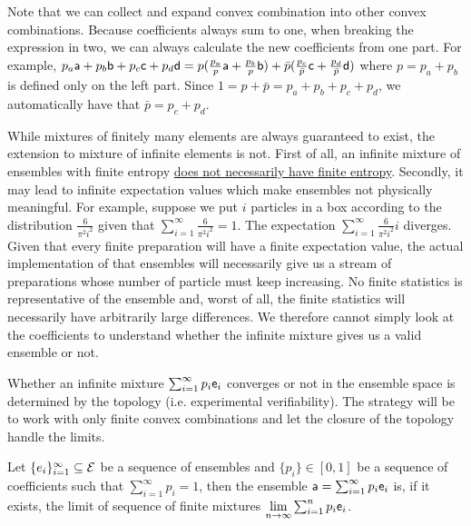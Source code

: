 \begin{remark}
	Note that we can collect and expand convex combination into other convex combinations. Because coefficients always sum to one, when breaking the expression in two, we can always calculate the new coefficients from one part. For example, $p_a \ens[a] + p_b \ens[b] + p_c \ens[c] + p_d \ens[d] = p(\frac{p_a}{p} \ens[a] + \frac{p_b}{p} \ens[b]) + \bar{p}(\frac{p_c}{\bar{p}} \ens[c] + \frac{p_d}{\bar{p}} \ens[d])$ where $p = p_a + p_b$ is defined only on the left part. Since $1 = p + \bar{p} = p_a +p_b + p_c + p_d$, we automatically have that $\bar{p} = p_c + p_d$.
\end{remark}

While mixtures of finitely many elements are always guaranteed to exist, the extension to mixture of infinite elements is not. First of all, an infinite mixture of ensembles with finite entropy \href{https://arxiv.org/pdf/1212.5630}{does not necessarily have finite entropy}. Secondly, it may lead to infinite expectation values which make ensembles not physically meaningful. For example, suppose we put $i$ particles in a box according to the distribution $\frac{6}{\pi^2 i^2}$ given that $\sum_{i=1}^{\infty} \frac{6}{\pi^2 i^2}=1$. The expectation $\sum_{i=1}^{\infty} \frac{6}{\pi^2 i^2} i$ diverges. Given that every finite preparation will have a finite expectation value, the actual implementation of that ensembles will necessarily give us a stream of preparations whose number of particle must keep increasing. No finite statistics is representative of the ensemble and, worst of all, the finite statistics will necessarily have arbitrarily large differences. We therefore cannot simply look at the coefficients to understand whether the infinite mixture gives us a valid ensemble or not.

Whether an infinite mixture $\sum_{i=1}^\infty p_i \ens_i$ converges or not in the ensemble space is determined by the topology (i.e. experimental verifiability). The strategy will be to work with only finite convex combinations and let the closure of the topology handle the limits.

\begin{defn}
	Let $\{e_i\}_{i=1}^{\infty} \subseteq \Ens$ be a sequence of ensembles and $\{p_i\} \in [0,1]$ be a sequence of coefficients such that $\sum_{i=1}^{\infty} p_i = 1$, then the ensemble $\ens[a] = \sum_{i=1}^{\infty} p_i \ens_i$ is, if it exists, the limit of sequence of finite mixtures $\lim\limits_{n\to\infty} \sum_{i=1}^{n} p_i \ens_i$.
\end{defn}


